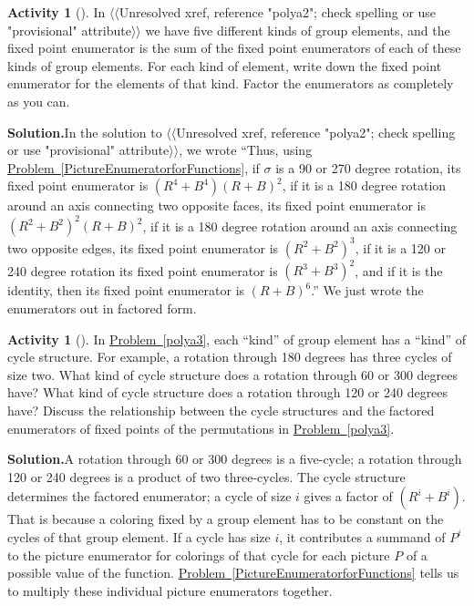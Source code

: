 \documentclass[10pt,]{book}
\theoremstyle{plain}
\theoremstyle{definition}
\newtheorem{activity}[project]{Activity}
\numberwithin{equation}{chapter}
\begin{document}
\begin{activity}[]\label{polya4}
In {$\langle\langle$Unresolved xref, reference "polya2"; check spelling or use "provisional" attribute$\rangle\rangle$} we have five different kinds of group elements, and the fixed point enumerator is the sum of the fixed point enumerators of each of these kinds of group elements. For each kind of element, write down the fixed point enumerator for the elements of that kind. Factor the enumerators as completely as you can.%
\par\medskip\noindent%
\textbf{Solution.}\quad In the solution to {$\langle\langle$Unresolved xref, reference "polya2"; check spelling or use "provisional" attribute$\rangle\rangle$}, we wrote ``Thus, using \hyperref[PictureEnumeratorforFunctions]{Problem~\ref{PictureEnumeratorforFunctions}}, if \(\sigma\) is a 90 or 270 degree rotation, its fixed point enumerator is \((R^4+B^4)(R+B)^2\), if it is a 180 degree rotation around an axis connecting two opposite faces, its fixed point enumerator is \((R^2+B^2)^2(R+B)^2\), if it is a 180 degree rotation around an axis connecting two opposite edges, its fixed point enumerator is \((R^2+B^2)^3\), if it is a 120 or 240 degree rotation its fixed point enumerator is \((R^3+B^3)^2\), and if it is the identity, then its fixed point enumerator is \((R+B)^6\).'' We just wrote the enumerators out in factored form.%
\end{activity}
\begin{activity}[]\label{polya3_5}
In \hyperref[polya3]{Problem~\ref{polya3}}, each ``kind'' of group element has a ``kind'' of cycle structure. For example, a rotation through 180 degrees has three cycles of size two. What kind of cycle structure does a rotation through 60 or 300 degrees have? What kind of cycle structure does a rotation through 120 or 240 degrees have? Discuss the relationship between the cycle structures and the factored enumerators of fixed points of the permutations in \hyperref[polya3]{Problem~\ref{polya3}}.%
\par\medskip\noindent%
\textbf{Solution.}\quad A rotation through 60 or 300 degrees is a five-cycle; a rotation through 120 or 240 degrees is a product of two three-cycles. The cycle structure determines the factored enumerator; a cycle of size \(i\) gives a factor of \((R^i+B^i)\). That is because a coloring fixed by a group element has to be constant on the cycles of that group element. If a cycle has size \(i\), it contributes a summand of \(P^i\) to the picture enumerator for colorings of that cycle for each picture \(P\) of a possible value of the function. \hyperref[PictureEnumeratorforFunctions]{Problem~\ref{PictureEnumeratorforFunctions}} tells us to multiply these individual picture enumerators together.%
\end{activity}
\end{document}
